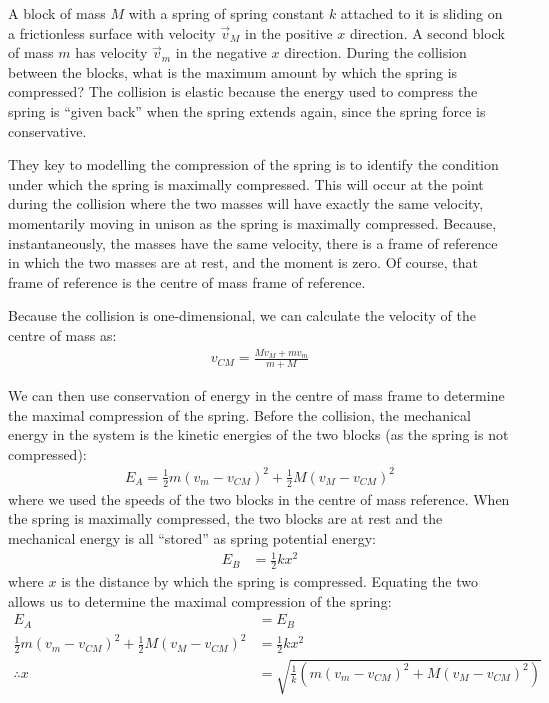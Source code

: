 \begin{example}{ A block of mass $M$ with a spring of spring constant $k$ attached to it is sliding on a frictionless surface with velocity $\vec v_M$ in the positive $x$ direction. A second block of mass $m$ has velocity $\vec v_m$ in the negative $x$ direction. During the collision between the blocks, what is the maximum amount by which the spring is compressed?
}
The collision is elastic because the energy used to compress the spring is ``given back'' when the spring extends again, since the spring force is conservative. 

They key to modelling the compression of the spring is to identify the condition under which the spring is maximally compressed. This will occur at the point during the collision where the two masses will have exactly the same velocity, momentarily moving in unison as the spring is maximally compressed. Because, instantaneously, the masses have the same velocity, there is a frame of reference in which the two masses are at rest, and the moment is zero. Of course, that frame of reference is the centre of mass frame of reference. 

Because the collision is one-dimensional, we can calculate the velocity of the centre of mass as:
\begin{align*}
v_{CM} = \frac{Mv_M+mv_m}{m+M}
\end{align*}

We can then use conservation of energy in the centre of mass frame to determine the maximal compression of the spring. Before the collision, the mechanical energy in the system is the kinetic energies of the two blocks (as the spring is not compressed):
\begin{align*}
E_A=\frac{1}{2}m(v_m-v_{CM})^2+\frac{1}{2}M(v_M-v_{CM})^2
\end{align*}
where we used the speeds of the two blocks in the centre of mass reference. When the spring is maximally compressed, the two blocks are at rest and the mechanical energy is all ``stored'' as spring potential energy:
\begin{align*}
E_B&=\frac{1}{2}kx^2
\end{align*}
where $x$ is the distance by which the spring is compressed. Equating the two allows us to determine the maximal compression of the spring:
\begin{align*}
E_A &= E_B \\
\frac{1}{2}m(v_m-v_{CM})^2+\frac{1}{2}M(v_M-v_{CM})^2 &= \frac{1}{2}kx^2\\
\therefore x &= \sqrt{\frac{1}{k}(m(v_m-v_{CM})^2+M(v_M-v_{CM})^2) }
\end{align*}
\end{example}

